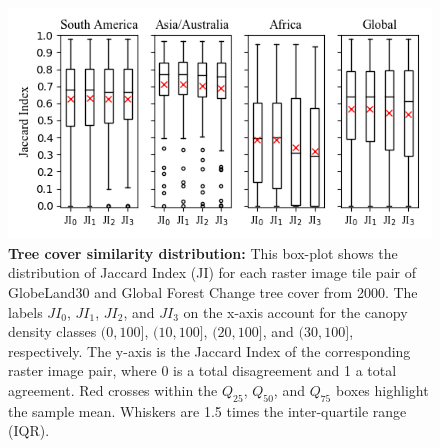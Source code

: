			\begin{figure}[ht]
				\centering
				\includegraphics[scale=.91]{img/jaccard}
				\caption[Tree cover similarity distribution]{\textbf{Tree cover similarity distribution:} This box-plot shows the distribution of Jaccard Index (JI) for each raster image tile pair of GlobeLand30 and Global Forest Change tree cover from 2000. The labels $JI_0$, $JI_1$, $JI_2$, and $JI_3$ on the x-axis account for the canopy density classes $(0,100]$, $(10,100]$, $(20,100]$, and $(30,100]$, respectively. The y-axis is the Jaccard Index of the corresponding raster image pair, where 0 is a total disagreement and 1 a total agreement. Red crosses within the $Q_{25}$, $Q_{50}$, and $Q_{75}$ boxes highlight the sample mean. Whiskers are 1.5 times the inter-quartile range (IQR).}
				\label{fig:jaccard}
			\end{figure}


